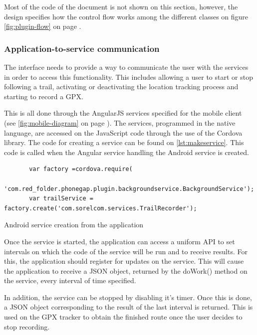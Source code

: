 Most of the code of the document is not shown on this section, however, the design specifies how the control flow works among the different classes on figure \ref{fig:plugin-flow} on page \pageref{fig:plugin-flow}.

\subsubsection*{Application-to-service communication}

The interface needs to provide a way to communicate the user with the services in order to access this functionality. This includes allowing a user to start or stop following a trail, activating or deactivating the location tracking process and starting to record a GPX.

This is all done through the AngularJS services specified for the mobile client (see \ref{fig:mobile-diagram} on page \pageref{fig:mobile-diagram}). The services, programmed in the native language, are accessed on the JavaScript code through the use of the Cordova library. The code for creating a service can be found on \ref{lst:makeservice}. This code is called when the Angular service handling the Android service is created.

\begin{listing}[ht]\centering
  \begin{minipage}{.8\textwidth}
    \begin{verbatim}
       var factory =cordova.require(
        'com.red_folder.phonegap.plugin.backgroundservice.BackgroundService');
       var trailService = factory.create('com.sorelcom.services.TrailRecorder');
    \end{verbatim}
  \end{minipage}
  \caption{Android service creation from the application}\label{lst:makeservice}
\end{listing}

Once the service is started, the application can access a uniform API to set intervals on which the code of the service will be run and to receive results. For this, the application should register for updates on the service. This will cause the application to receive a JSON object, returned by the doWork() method on the service, every interval of time specified.

In addition, the service can be stopped by disabling it's timer. Once this is done, a JSON object corresponding to the result of the last interval is returned. This is used on the GPX tracker to obtain the finished route once the user decides to stop recording.

